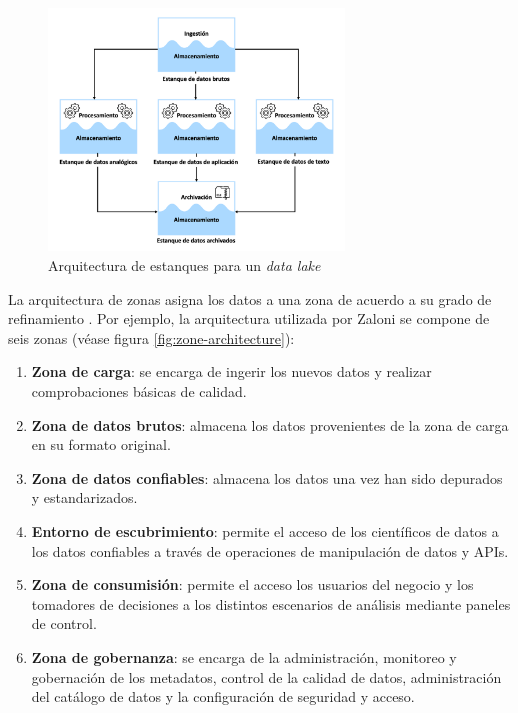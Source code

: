 \begin{figure}[h!]
    \centering
    \includegraphics[width=0.7\textwidth]{Images/pond-architecture.png}
    \caption{Arquitectura de estanques para un \textit{data lake}}
    \label{fig:pond-architecture}
\end{figure}


La arquitectura de zonas asigna los datos a una zona de acuerdo a su grado de refinamiento \cite{giebler2019leveraging}. Por ejemplo,
la arquitectura utilizada por Zaloni \cite{sharma2018architecting} se compone de seis zonas (véase figura \ref{fig:zone-architecture}):

\begin{enumerate}
    \item \textbf{Zona de carga}: se encarga de ingerir los nuevos datos y realizar comprobaciones básicas de calidad.
    \item \textbf{Zona de datos brutos}: almacena los datos provenientes de la zona de carga en su formato original.
    \item \textbf{Zona de datos confiables}: almacena los datos una vez han sido depurados y estandarizados.
    \item \textbf{Entorno de escubrimiento}: permite el acceso de los científicos de datos a los datos confiables a través de operaciones de manipulación de datos y APIs. 
    \item \textbf{Zona de consumisión}: permite el acceso los usuarios del negocio y los tomadores de decisiones a los distintos escenarios de análisis mediante paneles de control.
    \item \textbf{Zona de gobernanza}: se encarga de la administración, monitoreo y gobernación de los metadatos, control de la calidad de datos, administración del catálogo de datos y
    la configuración de seguridad y acceso.
\end{enumerate}

